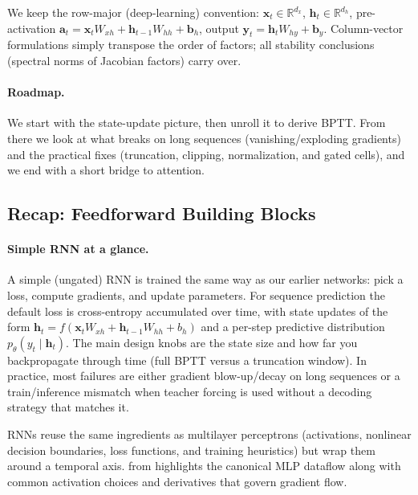 \begin{tcolorbox}[summarybox, title={Shape reminder}]
We keep the row-major (deep-learning) convention: \(\mathbf{x}_t \in \mathbb{R}^{d_x}\), \(\mathbf{h}_t \in \mathbb{R}^{d_h}\), pre-activation \(\mathbf{a}_t = \mathbf{x}_t W_{xh} + \mathbf{h}_{t-1} W_{hh} + \mathbf{b}_h\), output \(\mathbf{y}_t = \mathbf{h}_t W_{hy} + \mathbf{b}_y\). Column-vector formulations simply transpose the order of factors; all stability conclusions (spectral norms of Jacobian factors) carry over.
\end{tcolorbox}

\paragraph{Roadmap.}\label{sec:rnn_outline_of_this_chapter}
We start with the state-update picture, then unroll it to derive BPTT. From there we look at what breaks on long sequences (vanishing/exploding gradients) and the practical fixes (truncation, clipping, normalization, and gated cells), and we end with a short bridge to attention.

\subsection{Recap: Feedforward Building Blocks}
\label{sec:rnn_recap_feedforward_building_blocks}

\paragraph{Simple RNN at a glance.}
A simple (ungated) RNN is trained the same way as our earlier networks: pick a loss, compute gradients, and update parameters. For sequence prediction the default loss is cross\hyp{}entropy accumulated over time, with state updates of the form
\(\mathbf{h}_t = f(\mathbf{x}_t W_{xh} + \mathbf{h}_{t-1} W_{hh} + b_h)\)
and a per\hyp{}step predictive distribution \(p_\theta(y_t\mid \mathbf{h}_t)\).
The main design knobs are the state size and how far you backpropagate through time (full BPTT versus a truncation window). In practice, most failures are either gradient blow\hyp{}up/decay on long sequences or a train/inference mismatch when teacher forcing is used without a decoding strategy that matches it.

RNNs reuse the same ingredients as multilayer perceptrons (activations, nonlinear decision boundaries, loss functions, and training heuristics) but wrap them around a temporal axis.  from  highlights the canonical MLP dataflow along with common activation choices and derivatives that govern gradient flow.

